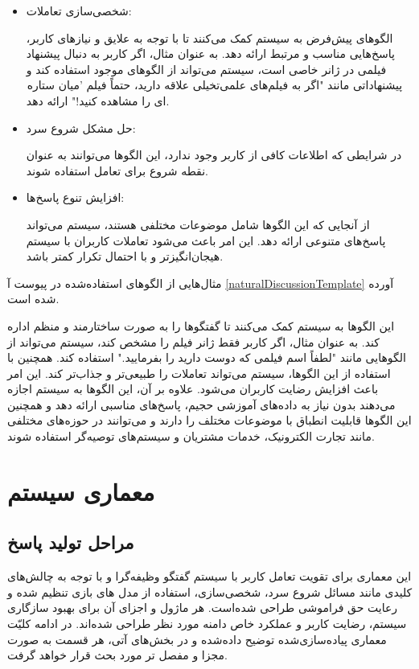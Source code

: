 \begin{itemize}
\item

شخصی‌سازی تعاملات:

الگوهای پیش‌فرض به سیستم کمک می‌کنند تا با توجه به علایق و نیازهای کاربر، پاسخ‌هایی مناسب و مرتبط ارائه دهد. به عنوان مثال، اگر کاربر به دنبال پیشنهاد فیلمی در ژانر خاصی است، سیستم می‌تواند از الگوهای موجود استفاده کند و پیشنهاداتی مانند "اگر به فیلم‌های علمی‌تخیلی علاقه دارید، حتماً فیلم 'میان ستاره ای را مشاهده کنید!" ارائه دهد.
\item

حل مشکل شروع سرد:

در شرایطی که اطلاعات کافی از کاربر وجود ندارد، این الگوها می‌توانند به عنوان نقطه شروع برای تعامل استفاده شوند. 

\item
افزایش تنوع پاسخ‌ها:

از آنجایی که این الگوها شامل موضوعات مختلفی هستند، سیستم می‌تواند پاسخ‌های متنوعی ارائه دهد. این امر باعث می‌شود تعاملات کاربران با سیستم هیجان‌انگیزتر و با احتمال تکرار کمتر باشد.
\end{itemize}
مثال‌هایی از الگوهای استفاده‌شده در پیوست آ%
\ref{naturalDiscussionTemplate}
 آورده شده است.


این الگوها به سیستم کمک می‌کنند تا گفتگوها را به صورت ساختارمند و منظم اداره کند. به عنوان مثال، اگر کاربر فقط ژانر فیلم را مشخص کند، سیستم می‌تواند از الگوهایی مانند "لطفاً اسم فیلمی که دوست دارید را بفرمایید." استفاده کند. همچنین با استفاده از این الگوها، سیستم می‌تواند تعاملات را طبیعی‌تر و جذاب‌تر کند. این امر باعث افزایش رضایت کاربران می‌شود. علاوه بر آن، این الگوها به سیستم اجازه می‌دهند بدون نیاز به داده‌های آموزشی حجیم، پاسخ‌های مناسبی ارائه دهد و همچنین این الگوها قابلیت انطباق با موضوعات مختلف را دارند و می‌توانند در حوزه‌های مختلفی مانند تجارت الکترونیک، خدمات مشتریان و سیستم‌های توصیه‌گر استفاده شوند.



\section{معماری سیستم}
\label{sec:architecture}
\subsection{مراحل تولید پاسخ}

این معماری برای تقویت تعامل کاربر با سیستم گفتگو وظیفه‌گرا و با  توجه به چالش‌های کلیدی مانند مسائل شروع سرد، شخصی‌سازی، استفاده از مدل های بازی تنظیم شده و رعایت حق فراموشی طراحی شده‌است. هر ماژول و اجزای آن برای بهبود سازگاری سیستم، رضایت کاربر و عملکرد خاص دامنه مورد نظر طراحی شده‌اند. در ادامه کلیّت معماری پیاده‌سازی‌شده توضیح داده‌شده و در بخش‌های آتی، هر قسمت به صورت مجزا و مفصل تر مورد بحث قرار خواهد گرفت.

